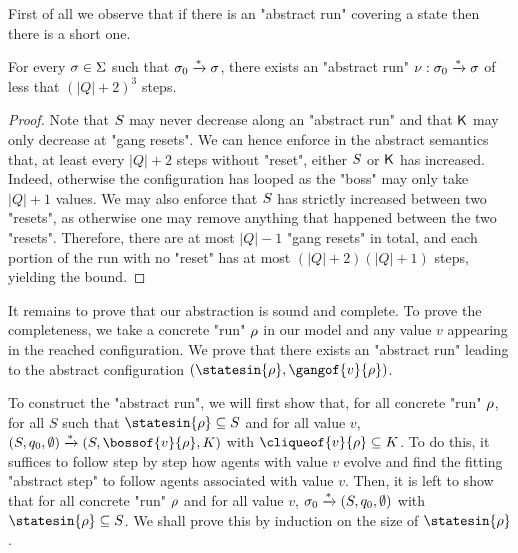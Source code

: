 First of all we observe that if there is an "abstract run" covering a state then there is a short one.

\begin{lemma}
	\label{lem:short-run}
	For every $\sigma \in \Sigma$ such that $\sigma_0 \xrightarrow{*} \sigma$, there exists an "abstract run" $\nu: \sigma_0 \xrightarrow{*} \sigma$ of less that $(|Q|+2)^3$ steps.
\end{lemma}

\ifproofs
\begin{proof}
	Note that $S$ may never decrease along an "abstract run" and that $\mathsf{K}$ may only decrease at "gang resets".
	We can hence enforce in the abstract semantics that, at least every $|Q|+2$ steps without "reset", either $S$ or $\mathsf{K}$ has increased. Indeed, otherwise the configuration has looped as the "boss" may only take $|Q| +1$ values. We may also enforce that $S$ has strictly increased between two "resets", as otherwise one may remove anything that happened between the two "resets". Therefore, there are at most $|Q|-1$ "gang resets" in total, and each portion of the run with no "reset" has at most $(|Q|+2)(|Q|+1)$ steps, yielding the bound. 
\end{proof}
\fi

It remains to prove that our abstraction is sound and complete. 
To prove the completeness, we take a concrete "run" $\rho$ in our model and any value $v$ appearing in the reached configuration. We prove that there exists an "abstract run" leading to the abstract configuration $(\statesin{\run}, \gangof{v}{\run})$. 

To construct the "abstract run", we will first show that, for all concrete "run" $\rho$, for all $S$ such that $\statesin{\run} \subseteq S$ and for all value $v$, $(S, q_0, \emptyset) \step{\ast}(S, \bossof{\aval}{\run}, K)$ with $\cliqueof{\aval}{\run}\subseteq K$. To do this, it suffices to follow step by step how agents with value $v$ evolve and find the fitting "abstract step" to follow agents associated with value $v$. 
Then, it is left to show that for all concrete "run" $\rho$ and for all value $v$, $\sigma_0 \xrightarrow{\ast} (S, q_0, \emptyset)$ with $\statesin{\run} \subseteq S$. We shall prove this by induction on the size of $\statesin{\run}$. 

